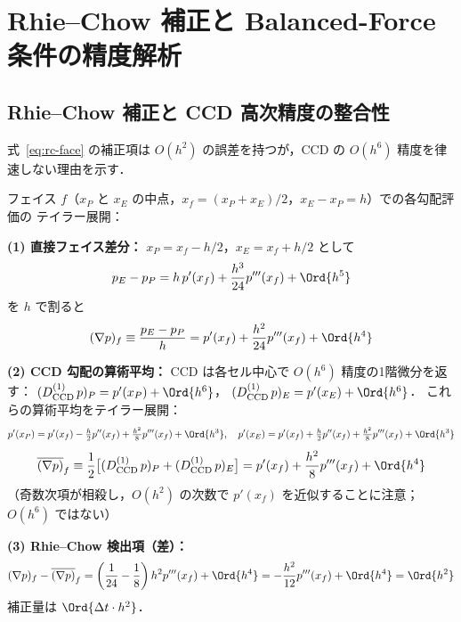 \section{Rhie--Chow 補正と Balanced-Force 条件の精度解析}
\label{app:rc_precision}

\subsection{Rhie--Chow 補正と CCD 高次精度の整合性}

式~\eqref{eq:rc-face} の補正項は $O(h^2)$ の誤差を持つが，CCD の $O(h^6)$ 精度を律速しない理由を示す．

フェイス $f$（$x_P$ と $x_E$ の中点，$x_f = (x_P+x_E)/2$，$x_E - x_P = h$）での各勾配評価の
テイラー展開：

\textbf{(1) 直接フェイス差分：}
$x_P = x_f - h/2$，$x_E = x_f + h/2$ として
\[
  p_E - p_P = h\,p'(x_f) + \frac{h^3}{24}p'''(x_f) + \Ord{h^5}
\]
を $h$ で割ると
\begin{equation}
  (\nabla p)_f \equiv \frac{p_E - p_P}{h} = p'(x_f) + \frac{h^2}{24}p'''(x_f) + \Ord{h^4}
  \label{eq:rc_face_taylor}
\end{equation}

\textbf{(2) CCD 勾配の算術平均：}
CCD は各セル中心で $O(h^6)$ 精度の1階微分を返す：
$(D^{(1)}_\mathrm{CCD}\,p)_P = p'(x_P) + \Ord{h^6}$，
$(D^{(1)}_\mathrm{CCD}\,p)_E = p'(x_E) + \Ord{h^6}$．
これらの算術平均をテイラー展開：
\[
  p'(x_P) = p'(x_f) - \tfrac{h}{2}p''(x_f) + \tfrac{h^2}{8}p'''(x_f) + \Ord{h^3},
  \quad
  p'(x_E) = p'(x_f) + \tfrac{h}{2}p''(x_f) + \tfrac{h^2}{8}p'''(x_f) + \Ord{h^3}
\]
\begin{equation}
  \overline{(\nabla p)}_f \equiv \frac{1}{2}\bigl[(D^{(1)}_\mathrm{CCD}\,p)_P + (D^{(1)}_\mathrm{CCD}\,p)_E\bigr]
    = p'(x_f) + \frac{h^2}{8}p'''(x_f) + \Ord{h^4}
  \label{eq:rc_avg_taylor}
\end{equation}
（奇数次項が相殺し，$O(h^2)$ の次数で $p'(x_f)$ を近似することに注意；$O(h^6)$ ではない）

\textbf{(3) Rhie--Chow 検出項（差）：}
\begin{equation}
  (\nabla p)_f - \overline{(\nabla p)}_f
  = \left(\frac{1}{24} - \frac{1}{8}\right)h^2 p'''(x_f) + \Ord{h^4}
  = -\frac{h^2}{12}p'''(x_f) + \Ord{h^4} = \Ord{h^2}
  \label{eq:rc_detection_taylor}
\end{equation}
補正量は $\Ord{\Delta t \cdot h^2}$．

